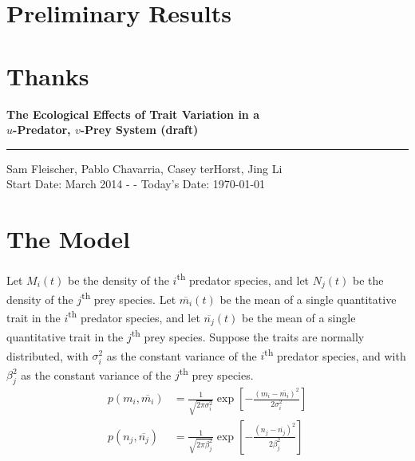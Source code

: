 \documentclass[10pt]{beamer}
\begin{document}
\section{Preliminary Results}
\begin{frame}
\end{frame}
\begin{frame}
\end{frame}

\section{Thanks}
\begin{frame}
\end{frame}

\begin{center}
	{\bf\LARGE The Ecological Effects of Trait Variation in a\\ \vskip 5pt$u$-Predator, $v$-Prey System \small (draft)}\\ \vskip 3pt \rule{4cm}{0.4pt}
	\vskip 5pt
	Sam Fleischer, Pablo Chavarria, Casey terHorst, Jing Li \\ Start Date:  March 2014 - - Today's Date: \today \rm
\end{center}

\vskip 15pt

									\section{The Model}

Let $M_i(t)$ be the density of the $i$\textsuperscript{th} predator species, and let $N_j(t)$ be the density of the $j$\textsuperscript{th} prey species.  Let $\overline{m_i}(t)$ be the mean of a single quantitative trait in the $i$\textsuperscript{th} predator species, and let $\overline{n_j}(t)$ be the mean of a single quantitative trait in the $j$\textsuperscript{th} prey species.  Suppose the traits are normally distributed, with $\sigma_i^2$ as the constant variance of the $i$\textsuperscript{th} predator species, and with $\beta_j^2$ as the constant variance of the $j$\textsuperscript{th} prey species.
\begin{align*}
	p(m_i, \overline{m_i}) &= \frac{1}{\sqrt{2\pi\sigma_i^2}}\exp\left[{-\frac{(m_i - \overline{m_i})^2}{2\sigma_i^2}}\right] \\
	p(n_j, \overline{n_j}) &= \frac{1}{\sqrt{2\pi\beta_j^2}}\exp\left[{-\frac{(n_j - \overline{n_j})^2}{2\beta_j^2}}\right]
\end{align*}
\end{document}
